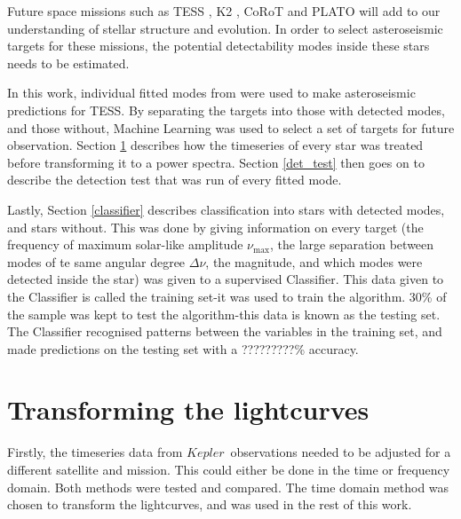 \documentclass[a4paper,fleqn,usenatbib,useAMS]{mnras}
\newcommand{\numax}{\ensuremath{\nu_{\textrm{max}}}}
\newcommand{\dnu}{\ensuremath{\Delta\nu}}
\newcommand{\kep}{\ensuremath{Kepler}}
\begin{document}

Future space missions such as TESS \citep{ricker_transiting_2014}, K2 \citep{howell_k2_2014}, CoRoT \citep{baglin_corot:_2006} and PLATO \citep{rauer_plato_2014} will add to our understanding of stellar structure and evolution. In order to select asteroseismic targets for these missions, the potential detectability modes inside these stars needs to be estimated.

In this work, individual fitted modes from \citet{davies_asteroseismology_2016} were used to make asteroseismic predictions for TESS. By separating the targets into those with detected modes, and those without, Machine Learning was used to select a set of targets for future observation. Section \ref{dataset} describes how the timeseries of every star was treated before transforming it to a power spectra. Section \ref{det_test} then goes on to describe the detection test that was run of every fitted mode.

Lastly, Section \ref{classifier} describes classification into stars with detected modes, and stars without. This was done by giving information on every target (the frequency of maximum solar-like amplitude \numax, the large separation between modes of te same angular degree \dnu, the magnitude, and which modes were detected inside the star) was given to a supervised Classifier. This data given to the Classifier is called the training set-it was used to train the algorithm. 30\% of the sample was kept to test the algorithm-this data is known as the testing set. The Classifier recognised patterns between the variables in the training set, and made predictions on the testing set with a ?????????\% accuracy. 


\section{Transforming the lightcurves}
\label{dataset}

Firstly, the timeseries data from \kep \ observations needed to be adjusted for a different satellite and mission. This could either be done in the time or frequency domain. Both methods were tested and compared. The time domain method was chosen to transform the lightcurves, and was used in the rest of this work.
\end{document}
